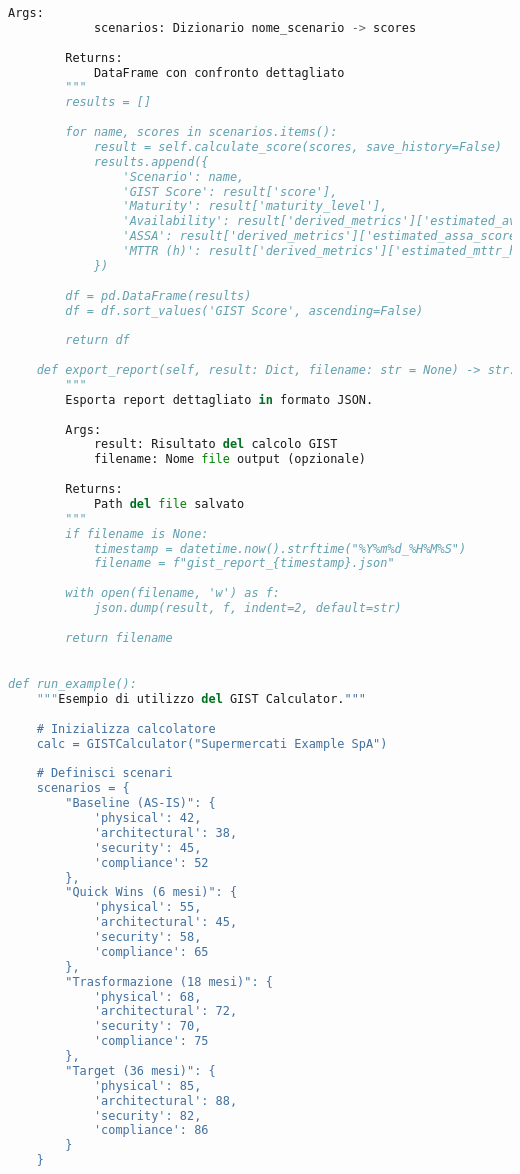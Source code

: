 \begin{lstlisting}[language=Python, caption={Implementazione completa GIST Calculator con validazione e reporting}]
        Args:
            scenarios: Dizionario nome_scenario -> scores
            
        Returns:
            DataFrame con confronto dettagliato
        """
        results = []
        
        for name, scores in scenarios.items():
            result = self.calculate_score(scores, save_history=False)
            results.append({
                'Scenario': name,
                'GIST Score': result['score'],
                'Maturity': result['maturity_level'],
                'Availability': result['derived_metrics']['estimated_availability'],
                'ASSA': result['derived_metrics']['estimated_assa_score'],
                'MTTR (h)': result['derived_metrics']['estimated_mttr_hours']
            })
        
        df = pd.DataFrame(results)
        df = df.sort_values('GIST Score', ascending=False)
        
        return df
    
    def export_report(self, result: Dict, filename: str = None) -> str:
        """
        Esporta report dettagliato in formato JSON.
        
        Args:
            result: Risultato del calcolo GIST
            filename: Nome file output (opzionale)
            
        Returns:
            Path del file salvato
        """
        if filename is None:
            timestamp = datetime.now().strftime("%Y%m%d_%H%M%S")
            filename = f"gist_report_{timestamp}.json"
        
        with open(filename, 'w') as f:
            json.dump(result, f, indent=2, default=str)
        
        return filename
    

def run_example():
    """Esempio di utilizzo del GIST Calculator."""
    
    # Inizializza calcolatore
    calc = GISTCalculator("Supermercati Example SpA")
    
    # Definisci scenari
    scenarios = {
        "Baseline (AS-IS)": {
            'physical': 42,
            'architectural': 38,
            'security': 45,
            'compliance': 52
        },
        "Quick Wins (6 mesi)": {
            'physical': 55,
            'architectural': 45,
            'security': 58,
            'compliance': 65
        },
        "Trasformazione (18 mesi)": {
            'physical': 68,
            'architectural': 72,
            'security': 70,
            'compliance': 75
        },
        "Target (36 mesi)": {
            'physical': 85,
            'architectural': 88,
            'security': 82,
            'compliance': 86
        }
    }
    

\end{lstlisting}
